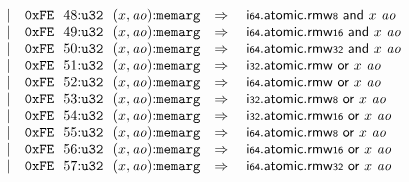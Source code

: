$$\begin{array}[t]{@{}lrrl@{}l@{}l@{}l@{}}
& & | & \mathtt{0xFE}~~48{:}{\mathtt{u32}}~~(x, {\mathit{ao}}){:}{\mathtt{memarg}} & \quad\Rightarrow\quad{} & {\mathsf{i{\scriptstyle 64}}{.}\mathsf{atomic}{.}\mathsf{rmw}}{\mathsf{{\scriptstyle 8}}}~\mathsf{and}~x~{\mathit{ao}} \\
& & | & \mathtt{0xFE}~~49{:}{\mathtt{u32}}~~(x, {\mathit{ao}}){:}{\mathtt{memarg}} & \quad\Rightarrow\quad{} & {\mathsf{i{\scriptstyle 64}}{.}\mathsf{atomic}{.}\mathsf{rmw}}{\mathsf{{\scriptstyle 16}}}~\mathsf{and}~x~{\mathit{ao}} \\
& & | & \mathtt{0xFE}~~50{:}{\mathtt{u32}}~~(x, {\mathit{ao}}){:}{\mathtt{memarg}} & \quad\Rightarrow\quad{} & {\mathsf{i{\scriptstyle 64}}{.}\mathsf{atomic}{.}\mathsf{rmw}}{\mathsf{{\scriptstyle 32}}}~\mathsf{and}~x~{\mathit{ao}} \\
& & | & \mathtt{0xFE}~~51{:}{\mathtt{u32}}~~(x, {\mathit{ao}}){:}{\mathtt{memarg}} & \quad\Rightarrow\quad{} & \mathsf{i{\scriptstyle 32}}{.}\mathsf{atomic}{.}\mathsf{rmw}~\mathsf{or}~x~{\mathit{ao}} \\
& & | & \mathtt{0xFE}~~52{:}{\mathtt{u32}}~~(x, {\mathit{ao}}){:}{\mathtt{memarg}} & \quad\Rightarrow\quad{} & \mathsf{i{\scriptstyle 64}}{.}\mathsf{atomic}{.}\mathsf{rmw}~\mathsf{or}~x~{\mathit{ao}} \\
& & | & \mathtt{0xFE}~~53{:}{\mathtt{u32}}~~(x, {\mathit{ao}}){:}{\mathtt{memarg}} & \quad\Rightarrow\quad{} & {\mathsf{i{\scriptstyle 32}}{.}\mathsf{atomic}{.}\mathsf{rmw}}{\mathsf{{\scriptstyle 8}}}~\mathsf{or}~x~{\mathit{ao}} \\
& & | & \mathtt{0xFE}~~54{:}{\mathtt{u32}}~~(x, {\mathit{ao}}){:}{\mathtt{memarg}} & \quad\Rightarrow\quad{} & {\mathsf{i{\scriptstyle 32}}{.}\mathsf{atomic}{.}\mathsf{rmw}}{\mathsf{{\scriptstyle 16}}}~\mathsf{or}~x~{\mathit{ao}} \\
& & | & \mathtt{0xFE}~~55{:}{\mathtt{u32}}~~(x, {\mathit{ao}}){:}{\mathtt{memarg}} & \quad\Rightarrow\quad{} & {\mathsf{i{\scriptstyle 64}}{.}\mathsf{atomic}{.}\mathsf{rmw}}{\mathsf{{\scriptstyle 8}}}~\mathsf{or}~x~{\mathit{ao}} \\
& & | & \mathtt{0xFE}~~56{:}{\mathtt{u32}}~~(x, {\mathit{ao}}){:}{\mathtt{memarg}} & \quad\Rightarrow\quad{} & {\mathsf{i{\scriptstyle 64}}{.}\mathsf{atomic}{.}\mathsf{rmw}}{\mathsf{{\scriptstyle 16}}}~\mathsf{or}~x~{\mathit{ao}} \\
& & | & \mathtt{0xFE}~~57{:}{\mathtt{u32}}~~(x, {\mathit{ao}}){:}{\mathtt{memarg}} & \quad\Rightarrow\quad{} & {\mathsf{i{\scriptstyle 64}}{.}\mathsf{atomic}{.}\mathsf{rmw}}{\mathsf{{\scriptstyle 32}}}~\mathsf{or}~x~{\mathit{ao}} \\

\end{array}$$
